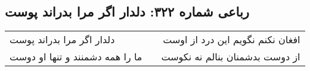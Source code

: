 \begin{center}
\section*{رباعی شماره ۳۲۲: دلدار اگر مرا بدراند پوست}
\label{sec:0322}
\begin{longtable}{l p{0.5cm} r}
دلدار اگر مرا بدراند پوست
&&
افغان نکنم نگویم این درد از اوست
\\
ما را همه دشمنند و تنها او دوست
&&
از دوست بدشمنان بنالم نه نکوست
\\
\end{longtable}
\end{center}
